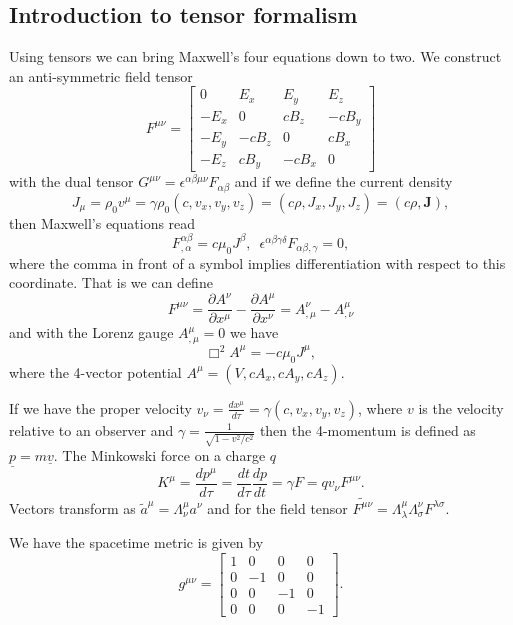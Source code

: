 \documentclass[12pt,aps,prb,preprint]{revtex4}   %
\newcommand{\be}{\begin{equation}}
\newcommand{\ee}{\end{equation}}
\begin{document}
\subsection{Introduction to tensor formalism}

Using tensors we can bring Maxwell's four equations down to two.
We construct an anti-symmetric field tensor
\be
F^{\mu \nu } = \begin{bmatrix} 0 & E_x & E_y & E_z \\
-E_x & 0 & c B_z & - c B_y\\
-E_y & -c B_z & 0 & c B_x \\
-E_z & c B_y & -c B_x & 0  \end{bmatrix} 
\ee
with the dual tensor $ G^{\mu \nu } = \epsilon^{\alpha \beta \mu \nu} F_{\alpha \beta}  $ and if we define the current density 
\be
J_{\mu} = \rho_0 v^{\mu} = \gamma \rho_0 (c,v_x,v_y,v_z) = ( c \rho,J_x,J_y,J_z) = ( c \rho,\textbf{J}),
\ee
then Maxwell's equations read
\be
F^{\alpha \beta }_{, \alpha} = c \mu_0 J^{\beta}  , \,\,\, \epsilon^{\alpha \beta \gamma \delta} F_{\alpha \beta , \gamma} = 0 ,
\ee
where the comma in front of a symbol implies differentiation with respect to this coordinate.
That is we can define
\be
F^{\mu \nu} =  \frac{\partial A^{\nu}}{\partial x^{\mu}} - \frac{\partial A^{\mu}}{\partial x^{\nu}} = A^{\nu}_{,\mu} - A^{\mu}_{,\nu}
\ee
and with the Lorenz gauge $ A^{\mu}_{, \mu} = 0 $ we have
\be
\Box^2 A^{\mu} = - c \mu_0 J^{\mu} ,
\ee
where the 4-vector potential $ A^{\mu} = ( V,c A_x,c A_y,c A_z) $.

If we have the proper velocity $ v_{\nu} = \frac{d x^{\mu}}{d \tau} = \gamma ( c, v_x,v_y,v_z) $, where $ v $ is the velocity relative to an observer and $ \gamma = \frac{1}{\sqrt{1-v^2/c^2}} $ then the 4-momentum is defined as $ \underline{p} = m \underline{v} $. The Minkowski force on a charge $ q $
\be
K^{\mu} = \frac{d p^{\mu}}{d \tau} = \frac{d t}{d \tau} \frac{d p}{d t} = \gamma F = q v_{\nu} F^{\mu \nu} .
\ee
Vectors transform as $ \tilde{a}^{\mu} = \Lambda^{\mu}_{\nu} a^{\nu} $ and for the field tensor $ \tilde{F^{\mu \nu}} = \Lambda^{\mu}_{\lambda} \Lambda^{\nu}_{\sigma} F^{\lambda \sigma} $.

We have the spacetime metric is given by
\be
g^{\mu \nu } = \begin{bmatrix} 1 & 0 & 0 & 0 \\
0 & -1 & 0 & 0\\
0 & 0 & -1 & 0 \\
0 & 0 & 0 & -1  \end{bmatrix} .
\ee
\end{document}
